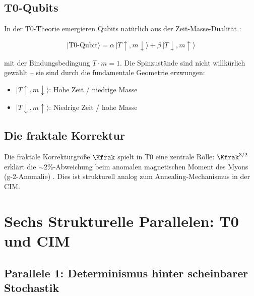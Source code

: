 \subsection{T0-Qubits}

In der T0-Theorie emergieren Qubits natürlich aus der Zeit-Masse-Dualität 
\cite{pascher_quantum_2025}:

\begin{equation}
    |\text{T0-Qubit}\rangle = \alpha \, |T{\uparrow}, m{\downarrow}\rangle 
    + \beta \, |T{\downarrow}, m{\uparrow}\rangle
    \label{eq:t0_qubit}
\end{equation}

mit der Bindungsbedingung $T \cdot m = 1$. Die Spinzustände sind nicht willkürlich 
gewählt -- sie sind durch die fundamentale Geometrie erzwungen:

\begin{itemize}
    \item $|T{\uparrow}, m{\downarrow}\rangle$: Hohe Zeit / niedrige Masse 
    \item $|T{\downarrow}, m{\uparrow}\rangle$: Niedrige Zeit / hohe Masse
\end{itemize}

\subsection{Die fraktale Korrektur}

Die fraktale Korrekturgröße $\Kfrak$ spielt in T0 eine zentrale Rolle: 
$\Kfrak^{3/2}$ erklärt die $\sim 2\%$-Abweichung beim anomalen magnetischen 
Moment des Myons (g-2-Anomalie) \cite{pascher_g2_2025}. Dies ist strukturell 
analog zum Annealing-Mechanismus in der CIM.

\clearpage

\section{Sechs Strukturelle Parallelen: T0 und CIM}
\label{sec:parallels}

\subsection{Parallele 1: Determinismus hinter scheinbarer Stochastik}

